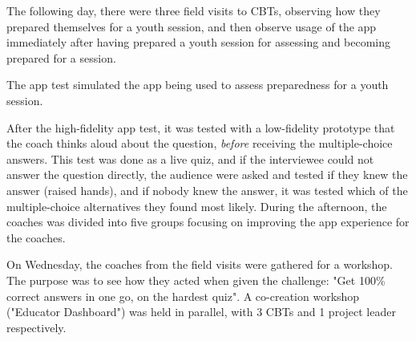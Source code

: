 The following day, there were three field visits to CBTs, observing how they prepared themselves for a youth session, and then observe usage of the app immediately after having prepared a youth session for assessing and becoming prepared for a session.

The app test simulated the app being used to assess preparedness for a youth session.

After the high-fidelity app test, it was tested with a low-fidelity prototype that the coach thinks aloud about the question, \textit{before} receiving the multiple-choice answers. This test was done as a live quiz, and if the interviewee could not answer the question directly, the audience were asked and tested if they knew the answer (raised hands), and if nobody knew the answer, it was tested which of the multiple-choice alternatives they found most likely. During the afternoon, the coaches was divided into five groups focusing on improving the app experience for the coaches.

On Wednesday, the coaches from the field visits were gathered for a workshop. The purpose was to see how they acted when given the challenge: "Get 100\% correct answers in one go, on the hardest quiz". A co-creation workshop ("Educator Dashboard") was held in parallel, with 3 CBTs and 1 project leader respectively.
